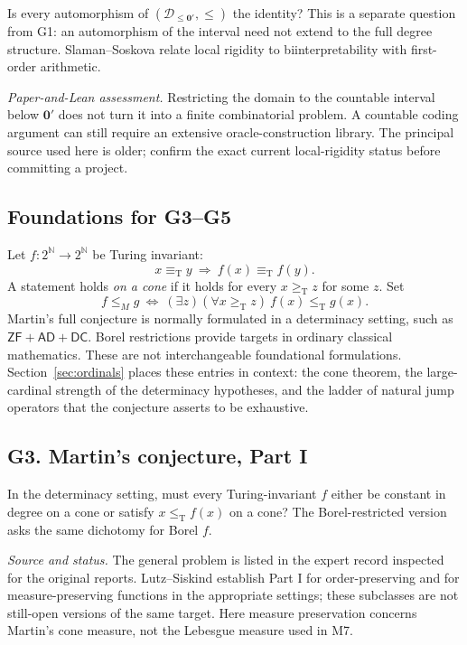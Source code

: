 \documentclass[11pt,a4paper]{article}
\newcommand{\N}{\mathbb N}
\newcommand{\D}{\mathcal D}
\newcommand{\Cantor}{2^{\N}}
\newcommand{\leT}{\leq_{\mathrm T}}
\newcommand{\geT}{\geq_{\mathrm T}}
\newcommand{\eqT}{\equiv_{\mathrm T}}
\newcommand{\onejump}{\mathbf0'}
\newcommand{\status}[1]{\par\noindent\textit{Source and status.} #1\par}
\newcommand{\assessment}[1]{\par\noindent\textit{Paper-and-Lean assessment.} #1\par}
\theoremstyle{definition}\newtheorem{definition}[theorem]{Definition}
\theoremstyle{remark}\newtheorem{remark}[theorem]{Remark}
\begin{document}
Is every automorphism of $(\D_{\leq\onejump},\leq)$ the identity? This is a separate question from G1: an automorphism of the interval need not extend to the full degree structure. Slaman--Soskova relate local rigidity to biinterpretability with first-order arithmetic.\cite{SS}

\assessment{Restricting the domain to the countable interval below $\onejump$ does not turn it into a finite combinatorial problem. A countable coding argument can still require an extensive oracle-construction library. The principal source used here is older; confirm the exact current local-rigidity status before committing a project.}

\subsection{Foundations for G3--G5}

Let $f:\Cantor\to\Cantor$ be Turing invariant:
\[
 x\eqT y\ \Longrightarrow\ f(x)\eqT f(y).
\]
A statement holds \emph{on a cone} if it holds for every $x\geT z$ for some $z$. Set
\[
 f\leq_M g\ \Longleftrightarrow\
   (\exists z)(\forall x\geT z)\ f(x)\leT g(x).
\]
Martin's full conjecture is normally formulated in a determinacy setting, such as $\mathsf{ZF}+\mathsf{AD}+\mathsf{DC}$. Borel restrictions provide targets in ordinary classical mathematics. These are not interchangeable foundational formulations.\cite{MSS} Section~\ref{sec:ordinals} places these entries in context: the cone theorem, the large-cardinal strength of the determinacy hypotheses, and the ladder of natural jump operators that the conjecture asserts to be exhaustive.

\subsection{G3. Martin's conjecture, Part I \Lmark}
\label{entry:G3}

In the determinacy setting, must every Turing-invariant $f$ either be constant in degree on a cone or satisfy $x\leT f(x)$ on a cone? The Borel-restricted version asks the same dichotomy for Borel $f$.

\status{The general problem is listed in the expert record inspected for the original reports. Lutz--Siskind establish Part I for order-preserving and for measure-preserving functions in the appropriate settings; these subclasses are not still-open versions of the same target. Here measure preservation concerns Martin's cone measure, not the Lebesgue measure used in M7.\cite{MSS,LS,OLPMartin}}
\end{document}
